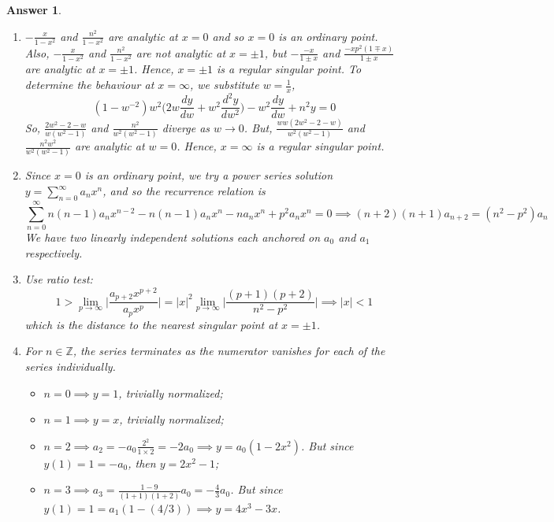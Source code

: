 \documentclass[a4paper]{article}
\newtheorem{ans}{Answer}[section]
\theoremstyle{new}
\begin{document}
\begin{ans}\leavevmode
\begin{enumerate}[label=(\alph*)]
\item $-\frac{x}{1-x^2}$ and $\frac{n^2}{1-x^2}$ are analytic at $x=0$ and so $x=0$ is an ordinary point. Also, $-\frac{x}{1-x^2}$ and  $\frac{n^2}{1-x^2}$ are not analytic at $x=\pm 1$, but $-\frac{-x}{1\pm x}$ and $\frac{-xp^2(1\mp x)}{1\pm x}$ are analytic at $x=\pm1$. Hence, $x=\pm 1$ is a regular singular point. To determine the behaviour at $x=\infty$, we substitute $w=\frac{1}{x}$,
$$(1-w^{-2})w^2\bigg(2w\frac{dy}{dw}+w^2\frac{d^2y}{dw^2}\bigg)-w^2\frac{dy}{dw}+n^2y=0$$
So, $\frac{2w^2-2-w}{w(w^2-1)}$ and $\frac{n^2}{w^2(w^2-1)}$ diverge as $w\rightarrow 0$. But, $\frac{ww(2w^2-2-w)}{w^2(w^2-1)}$ and $\frac{n^2w^2}{w^2(w^2-1)}$ are analytic at $w=0$. Hence, $x=\infty$ is a regular singular point.
\item Since $x=0$ is an ordinary point, we try a power series solution $y=\sum_{n=0}^\infty a_nx^n$, and so the recurrence relation is
$$\sum_{n=0}^\infty n(n-1)a_nx^{n-2}-n(n-1)a_nx^n-na_nx^n+p^2a_nx^n=0\implies (n+2)(n+1)a_{n+2}=(n^2-p^2)a_n$$
We have two linearly independent solutions each anchored on $a_0$ and $a_1$ respectively.
\item Use ratio test:
$$1>\lim_{p\rightarrow\infty}\bigg|\frac{a_{p+2}x^{p+2}}{a_px^p}\bigg|=|x|^2\lim_{p\rightarrow\infty}\bigg|\frac{(p+1)(p+2)}{n^2-p^2}\bigg|\implies|x|<1$$
which is the distance to the nearest singular point at $x=\pm 1$.
\item For $n\in\mathbb{Z}$, the series terminates as the numerator vanishes for each of the series individually. 
\begin{itemize}
    \item $n=0\implies y=1$, trivially normalized;
    \item $n=1\implies y=x$, trivially normalized;
    \item $n=2\implies a_2=-a_0\frac{2^2}{1\times 2}=-2a_0\implies y=a_0(1-2x^2)$. But since $y(1)=1=-a_0$, then $y=2x^2-1$;
    \item $n=3\implies a_3=\frac{1-9}{(1+1)(1+2)}a_0=-\frac{4}{3}a_0$. But since $y(1)=1=a_1(1-(4/3))\implies y=4x^3-3x$.
\end{itemize}
\end{enumerate}
\end{ans}
\newpage
\end{document}
